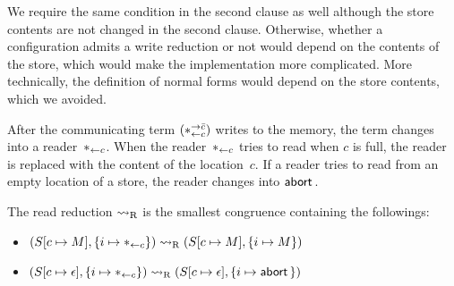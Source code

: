 We require the same condition in the second clause as well although
the store contents are not changed in the second clause.
Otherwise, whether a configuration admits a write reduction or not
would depend on the contents of the store, which would make the
implementation more complicated.  More technically, the definition of
normal forms would depend on the store contents, which we avoided.

After the communicating term $(\ast^{\rightarrow {\bar{c}}}_{\leftarrow{c}})$ writes to the memory,
the term changes into a reader~$\ast_{\leftarrow{c}}$.  When the reader~$\ast_{\leftarrow{c}}$
tries to
read when $c$ is full, the reader is replaced with the content of the
location~$c$.
If a reader tries to read from an empty location of a store,
the reader changes into $\mathsf{abort\,}$.
\begin{definition}
 \label{read}
 The read reduction $\rightsquigarrow_{\mathrm R}$ is the smallest congruence
 containing the
 followings:
\begin{itemize}
   \item $({S}{[c\mapsto M]},{\{i\mapsto {\ast_{\leftarrow{c}}}\}})\rightsquigarrow_{\mathrm R}
      ({S}{[c\mapsto M]},{\{i\mapsto {M}\}})$
   \item $({S}{[c\mapsto \epsilon]},{\{i\mapsto {\ast_{\leftarrow{c}}}\}})
       \rightsquigarrow_{\mathrm R} ({S}{[c\mapsto \epsilon]},{\{i\mapsto {\mathsf{abort\,}}\}})$
\end{itemize}
\end{definition}

